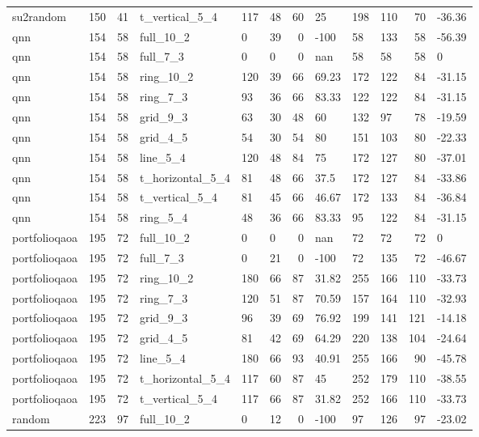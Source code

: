 \begin{longtable}{lrrlllrlllrl}
su2random & 150 & 41 & t\_vertical\_5\_4 & 117 & 48 & 60 & 25 & 198 & 110 & 70 & -36.36 \\
qnn & 154 & 58 & full\_10\_2 & 0 & 39 & 0 & -100 & 58 & 133 & 58 & -56.39 \\
qnn & 154 & 58 & full\_7\_3 & 0 & 0 & 0 & nan & 58 & 58 & 58 & 0 \\
qnn & 154 & 58 & ring\_10\_2 & 120 & 39 & 66 & 69.23 & 172 & 122 & 84 & -31.15 \\
qnn & 154 & 58 & ring\_7\_3 & 93 & 36 & 66 & 83.33 & 122 & 122 & 84 & -31.15 \\
qnn & 154 & 58 & grid\_9\_3 & 63 & 30 & 48 & 60 & 132 & 97 & 78 & -19.59 \\
qnn & 154 & 58 & grid\_4\_5 & 54 & 30 & 54 & 80 & 151 & 103 & 80 & -22.33 \\
qnn & 154 & 58 & line\_5\_4 & 120 & 48 & 84 & 75 & 172 & 127 & 80 & -37.01 \\
qnn & 154 & 58 & t\_horizontal\_5\_4 & 81 & 48 & 66 & 37.5 & 172 & 127 & 84 & -33.86 \\
qnn & 154 & 58 & t\_vertical\_5\_4 & 81 & 45 & 66 & 46.67 & 172 & 133 & 84 & -36.84 \\
qnn & 154 & 58 & ring\_5\_4 & 48 & 36 & 66 & 83.33 & 95 & 122 & 84 & -31.15 \\
portfolioqaoa & 195 & 72 & full\_10\_2 & 0 & 0 & 0 & nan & 72 & 72 & 72 & 0 \\
portfolioqaoa & 195 & 72 & full\_7\_3 & 0 & 21 & 0 & -100 & 72 & 135 & 72 & -46.67 \\
portfolioqaoa & 195 & 72 & ring\_10\_2 & 180 & 66 & 87 & 31.82 & 255 & 166 & 110 & -33.73 \\
portfolioqaoa & 195 & 72 & ring\_7\_3 & 120 & 51 & 87 & 70.59 & 157 & 164 & 110 & -32.93 \\
portfolioqaoa & 195 & 72 & grid\_9\_3 & 96 & 39 & 69 & 76.92 & 199 & 141 & 121 & -14.18 \\
portfolioqaoa & 195 & 72 & grid\_4\_5 & 81 & 42 & 69 & 64.29 & 220 & 138 & 104 & -24.64 \\
portfolioqaoa & 195 & 72 & line\_5\_4 & 180 & 66 & 93 & 40.91 & 255 & 166 & 90 & -45.78 \\
portfolioqaoa & 195 & 72 & t\_horizontal\_5\_4 & 117 & 60 & 87 & 45 & 252 & 179 & 110 & -38.55 \\
portfolioqaoa & 195 & 72 & t\_vertical\_5\_4 & 117 & 66 & 87 & 31.82 & 252 & 166 & 110 & -33.73 \\
random & 223 & 97 & full\_10\_2 & 0 & 12 & 0 & -100 & 97 & 126 & 97 & -23.02 \\

\end{longtable}
